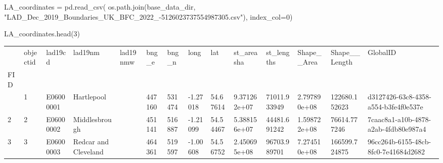 \documentclass[
  number]{elsarticle}
\newenvironment{Shaded}{\begin{snugshade}}{\end{snugshade}}
\newcommand{\DecValTok}[1]{\textcolor[rgb]{0.68,0.00,0.00}{#1}}
\newcommand{\NormalTok}[1]{\textcolor[rgb]{0.00,0.23,0.31}{#1}}
\newcommand{\OperatorTok}[1]{\textcolor[rgb]{0.37,0.37,0.37}{#1}}
\newcommand{\StringTok}[1]{\textcolor[rgb]{0.13,0.47,0.30}{#1}}
\begin{document}
\begin{Shaded}
\begin{Highlighting}[]
\NormalTok{LA\_coordinates }\OperatorTok{=}\NormalTok{ pd.read\_csv(}
\NormalTok{    os.path.join(base\_data\_dir, }\StringTok{"LAD\_Dec\_2019\_Boundaries\_UK\_BFC\_2022\_{-}5126023737554987305.csv"}\NormalTok{), index\_col}\OperatorTok{=}\DecValTok{0}\NormalTok{)}

\NormalTok{LA\_coordinates.head(}\DecValTok{3}\NormalTok{)}
\end{Highlighting}
\end{Shaded}

\begin{longtable}[]{@{}llllllllllllll@{}}
\toprule\noalign{}
& objectid & lad19cd & lad19nm & lad19nmw & bng\_e & bng\_n & long & lat
& st\_areasha & st\_lengths & Shape\_\_Area & Shape\_\_Length &
GlobalID \\
FID & & & & & & & & & & & & & \\
\midrule\noalign{}
\endhead
\bottomrule\noalign{}
\endlastfoot
1 & 1 & E06000001 & Hartlepool & & 447160 & 531474 & -1.27018 & 54.67614
& 9.371262e+07 & 71011.933949 & 2.797890e+08 & 122680.152623 &
d3127426-63c8-4358-a554-b3fe4f0e537e \\
2 & 2 & E06000002 & Middlesbrough & & 451141 & 516887 & -1.21099 &
54.54467 & 5.388156e+07 & 44481.691242 & 1.598722e+08 & 76614.777246 &
7caac8a1-a10b-4878-a2ab-4fdb80e987a4 \\
3 & 3 & E06000003 & Redcar and Cleveland & & 464361 & 519597 & -1.00608
& 54.56752 & 2.450695e+08 & 96703.989701 & 7.274510e+08 & 166599.724875
& 96cc264b-6155-48cb-8fc0-7e41684d2682 \\
\end{longtable}
\end{document}
